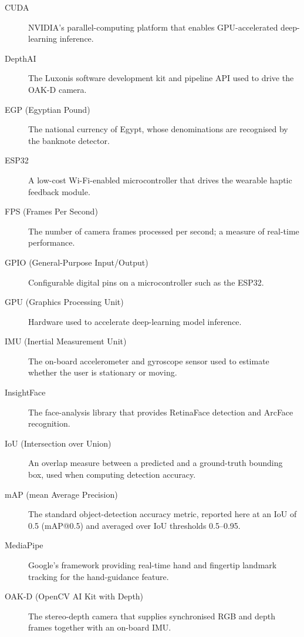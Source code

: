 \begin{description}
  \item[CUDA] NVIDIA's parallel-computing platform that enables GPU-accelerated deep-learning inference.

  \item[DepthAI] The Luxonis software development kit and pipeline API used to drive the OAK-D camera.

  \item[EGP (Egyptian Pound)] The national currency of Egypt, whose denominations are recognised by the banknote detector.

  \item[ESP32] A low-cost Wi-Fi-enabled microcontroller that drives the wearable haptic feedback module.

  \item[FPS (Frames Per Second)] The number of camera frames processed per second; a measure of real-time performance.

  \item[GPIO (General-Purpose Input/Output)] Configurable digital pins on a microcontroller such as the ESP32.

  \item[GPU (Graphics Processing Unit)] Hardware used to accelerate deep-learning model inference.

  \item[IMU (Inertial Measurement Unit)] The on-board accelerometer and gyroscope sensor used to estimate whether the user is stationary or moving.

  \item[InsightFace] The face-analysis library that provides RetinaFace detection and ArcFace recognition.

  \item[IoU (Intersection over Union)] An overlap measure between a predicted and a ground-truth bounding box, used when computing detection accuracy.

  \item[mAP (mean Average Precision)] The standard object-detection accuracy metric, reported here at an IoU of 0.5 (mAP@0.5) and averaged over IoU thresholds 0.5--0.95.

  \item[MediaPipe] Google's framework providing real-time hand and fingertip landmark tracking for the hand-guidance feature.

  \item[OAK-D (OpenCV AI Kit with Depth)] The stereo-depth camera that supplies synchronised RGB and depth frames together with an on-board IMU.


\end{description}

